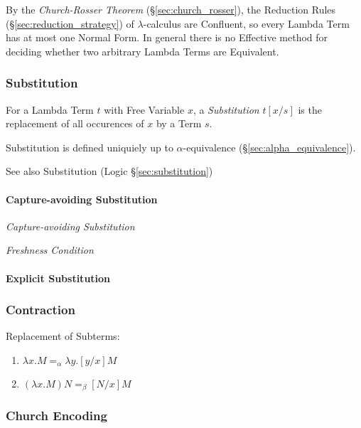 By the \emph{Church-Rosser Theorem} (\S\ref{sec:church_rosser}), the
Reduction Rules (\S\ref{sec:reduction_strategy}) of $\lambda$-calculus
are Confluent, so every Lambda Term has at most one Normal Form. In
general there is no Effective method for deciding whether two
arbitrary Lambda Terms are Equivalent.




\subsubsection{Substitution}\label{sec:lambda_substitution}

For a Lambda Term $t$ with Free Variable $x$, a \emph{Substitution}
$t[x/s]$ is the replacement of all occurences of $x$ by a Term $s$.

Substitution is defined uniquiely up to $\alpha$-equivalence
(\S\ref{sec:alpha_equivalence}).

\fist See also Substitution (Logic \S\ref{sec:substitution})



\paragraph{Capture-avoiding Substitution}\label{sec:capture_avoiding}\hfill

\emph{Capture-avoiding Substitution}

\emph{Freshness Condition}



\paragraph{Explicit Substitution}\label{sec:explicit_substitution}\hfill



\subsubsection{Contraction}\label{sec:contraction}\cite{seldin03}

Replacement of Subterms:
\begin{enumerate}
  \item $\lambda x . M =_\alpha \lambda y . [y/x]M$
  \item $(\lambda x . M)N =_\beta [N/x]M$
\end{enumerate}



\subsubsection{Church Encoding}\label{sec:church_encoding}

